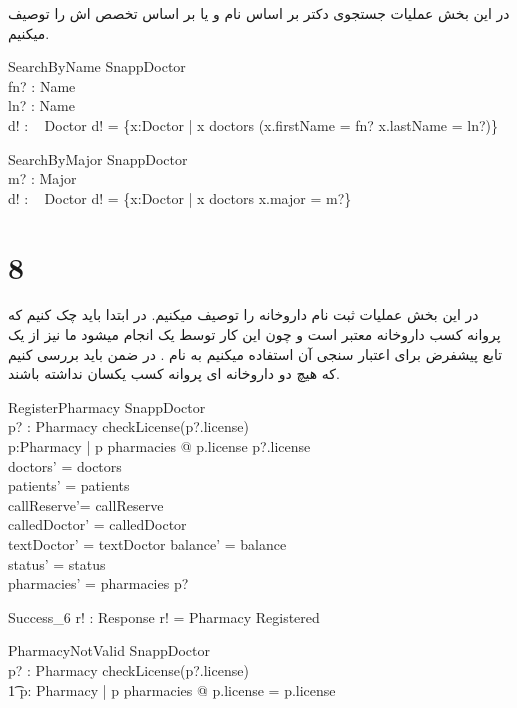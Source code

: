 \documentclass{article}
\begin{document}
در این بخش عملیات جستجوی دکتر بر اساس نام و یا بر اساس تخصص اش را توصیف میکنیم.
\begin{schema}{SearchByName}
\Xi SnappDoctor\\
fn? : Name\\
ln? : Name\\
d! : \power~ Doctor
\where
d! = \{x:Doctor | x \in doctors \land (x.firstName = fn? \lor x.lastName = ln?)\}
\end{schema}

\begin{schema}{SearchByMajor}
\Xi SnappDoctor\\
m? : Major\\
d! : \power~ Doctor
\where
d! = \{x:Doctor | x \in doctors \land x.major = m?\}
\end{schema}

\section*{8}

در این بخش عملیات ثبت نام داروخانه را توصیف میکنیم. در ابتدا باید چک کنیم که پروانه کسب داروخانه معتبر است و چون این کار توسط یک  انجام میشود ما نیز از یک تابع پیشفرض برای اعتبار سنجی آن استفاده میکنیم به نام  . در ضمن باید بررسی کنیم که هیچ دو داروخانه ای پروانه کسب یکسان نداشته باشند.
\begin{schema}{RegisterPharmacy}
\Delta SnappDoctor\\
p? : Pharmacy
\where
checkLicense(p?.license)\\
\forall p:Pharmacy | p \in pharmacies @ p.license \neq p?.license\\
doctors' = doctors\\
patients' = patients\\ 
callReserve'= callReserve\\
calledDoctor' = calledDoctor\\
textDoctor' = textDoctor
balance' = balance\\
status' = status\\
pharmacies' = pharmacies \cup p?  
\end{schema}

\begin{schema}{Success_6}
r! : Response
\where
r! = Pharmacy Registered
\end{schema}

\begin{schema}{PharmacyNotValid}
\Xi SnappDoctor\\
p? : Pharmacy
\where
\neg checkLicense(p?.license) \lor\\ 
\t1 \exists p: Pharmacy | p \in pharmacies @ p.license = p.license
\end{schema}
\end{document}
